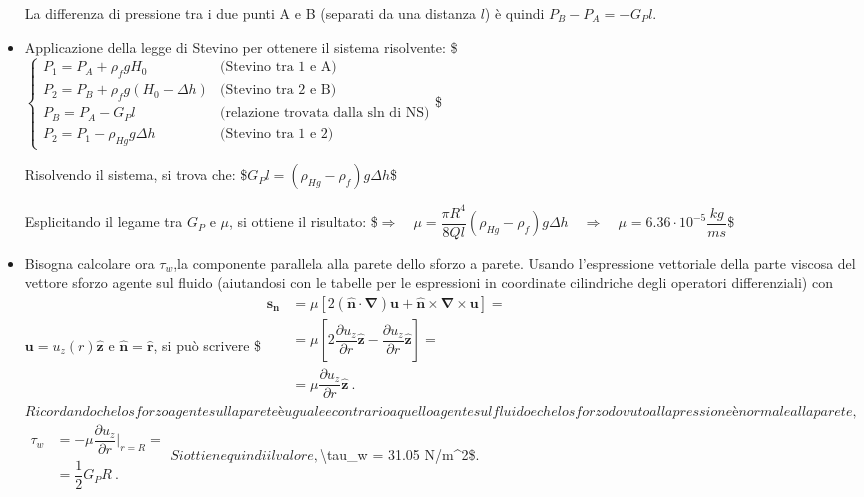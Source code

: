 \documentclass[letterpaper,10pt,italian]{jupyterBook}
\begin{document}
\begin{itemize}
\sphinxAtStartPar
La differenza di pressione tra i due punti A e B (separati da una
distanza \(l\)) è quindi \(P_B - P_A = -G_P l\).

\item {} 
\sphinxAtStartPar
Applicazione della legge di Stevino per ottenere il sistema
risolvente: \$\(\begin{cases}
  P_1 = P_A + \rho_f g H_0 & \text{(Stevino tra 1 e A)} \\
  P_2 = P_B + \rho_f g (H_0-\Delta h) & \text{(Stevino tra 2 e B)} \\
  P_B = P_A - G_P l & \text{(relazione trovata dalla sln di NS)} \\
  P_2 = P_1 - \rho_{Hg} g \Delta h & \text{(Stevino tra 1 e 2)}
\end{cases}\)\$

\sphinxAtStartPar
Risolvendo il sistema, si trova che:
\$\(G_P l = (\rho_{Hg} - \rho_f) g \Delta h\)\$

\sphinxAtStartPar
Esplicitando il legame tra \(G_P\) e \(\mu\), si ottiene il risultato:
\$\(\Rightarrow \quad \mu = \dfrac{\pi R^4}{8 Q l} (\rho_{Hg} - \rho_f) g \Delta h \quad \Rightarrow \quad \mu = 6.36 \cdot 10^{-5} \dfrac{kg}{m s}\)\$

\item {} 
\sphinxAtStartPar
Bisogna calcolare ora \(\tau_w\),la componente parallela alla parete
dello sforzo a parete. Usando l’espressione vettoriale della parte
viscosa del vettore sforzo agente sul fluido (aiutandosi con le
tabelle per le espressioni in coordinate cilindriche degli operatori
differenziali) con \(\bm{u} = u_z(r)\bm{\hat{z}}\) e
\(\bm{\hat{n}} = \bm{\hat{r}}\), si può scrivere \$\(\begin{aligned}
   \bm{s_n} & = \mu \left[ 2 (\bm{\hat{n}} \cdot \bm{\nabla} ) \bm{u} + \bm{\hat{n}} \times \bm{\nabla} \times \bm{u}  \right] = \\
            & = \mu \left[ 2 \dfrac{\partial u_z}{\partial r}\bm{\hat{z}} - \dfrac{\partial u_z}{\partial r} \bm{\hat{z}} \right] = \\
            & = \mu \dfrac{\partial u_z}{\partial r}\bm{\hat{z}} \ .
\end{aligned}\)\( Ricordando che lo sforzo agente sulla parete è
uguale e contrario a quello agente sul fluido e che lo sforzo dovuto
alla pressione è normale alla parete, \)\(\begin{aligned}
   \tau_w & = - \mu \dfrac{\partial u_z}{\partial r}\bigg|_{r=R} = \\
          & = \dfrac{1}{2} G_P R \ .
\end{aligned}\)\( Si ottiene quindi il valore, \)\textbackslash{}tau\_w = 31.05 N/m\textasciicircum{}2\$.

\end{itemize}
\end{document}
